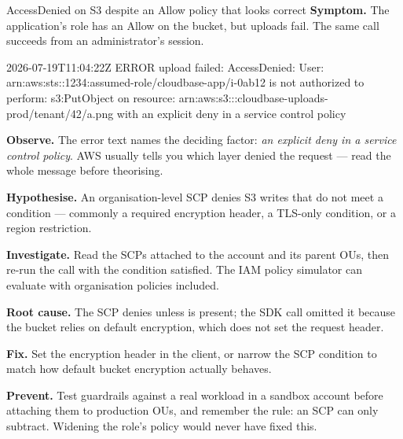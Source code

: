 \begin{debuglab}{AccessDenied on S3 despite an Allow policy that looks correct}
\textbf{Symptom.} The application's role has an  Allow on the bucket, but uploads fail. The same call succeeds from an administrator's session.

\begin{outbox}
2026-07-19T11:04:22Z ERROR upload failed: AccessDenied: User:
arn:aws:sts::1234:assumed-role/cloudbase-app/i-0ab12 is not authorized to
perform: s3:PutObject on resource: arn:aws:s3:::cloudbase-uploads-prod/tenant/42/a.png
with an explicit deny in a service control policy
\end{outbox}

\begin{tickcheck}
  \item \textbf{Observe.} The error text names the deciding factor: \emph{an explicit deny in a service control policy}. AWS usually tells you which layer denied the request --- read the whole message before theorising.
  \item \textbf{Hypothesise.} An organisation-level SCP denies S3 writes that do not meet a condition --- commonly a required encryption header, a TLS-only condition, or a region restriction.
  \item \textbf{Investigate.} Read the SCPs attached to the account and its parent OUs, then re-run the call with the condition satisfied. The IAM policy simulator can evaluate with organisation policies included.
  \item \textbf{Root cause.} The SCP denies  unless  is present; the SDK call omitted it because the bucket relies on default encryption, which does not set the request header.
  \item \textbf{Fix.} Set the encryption header in the client, or narrow the SCP condition to match how default bucket encryption actually behaves.
  \item \textbf{Prevent.} Test guardrails against a real workload in a sandbox account before attaching them to production OUs, and remember the rule: an SCP can only subtract. Widening the role's policy would never have fixed this.
\end{tickcheck}
\end{debuglab}



